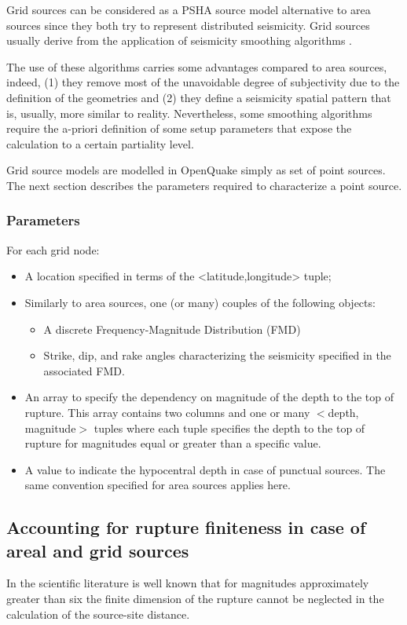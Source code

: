 Grid sources can be considered as a PSHA source model alternative to area 
sources since they both try to represent distributed seismicity. Grid sources 
usually derive from the application of seismicity smoothing algorithms 
\citep{frankel1995,woo1996}. 

The use of these algorithms carries some advantages compared to area sources, 
indeed, (1) they remove most of the unavoidable degree of subjectivity due to 
the definition of the geometries and (2) they define a seismicity spatial 
pattern that is, usually, more similar to reality. Nevertheless, some smoothing 
algorithms require the a-priori definition of some setup parameters that expose 
the calculation to a certain partiality level.

Grid source models are modelled in OpenQuake simply as set of 
point sources. The next section describes the parameters required to 
characterize a point source.
%
\subsubsection{Parameters}
For each grid node:
\begin{itemize}
\item A location specified in terms of the <latitude,longitude> tuple;
\item Similarly to area sources, one (or many) couples of the following objects:
	\begin{itemize}
	\item A discrete Frequency-Magnitude Distribution (FMD)
	\item Strike, dip, and rake angles characterizing the seismicity specified 
	in the associated FMD. 
	\end{itemize}
\item An array to specify the dependency on magnitude of the depth to the top of 
	rupture. This array contains two columns and one or many 
	$<$depth, magnitude$>$ tuples where each tuple specifies the depth to the 
	top of rupture for magnitudes equal or greater than a specific value. 
\item A value to indicate the hypocentral depth in case of punctual sources. The 
	same convention specified for area sources applies here. 
\end{itemize}
\subsection{Accounting for rupture finiteness in case of areal and grid sources}
In the scientific literature is well known that for magnitudes approximately 
greater than six the finite dimension of the rupture cannot be neglected in 
the calculation of the source-site distance. 

